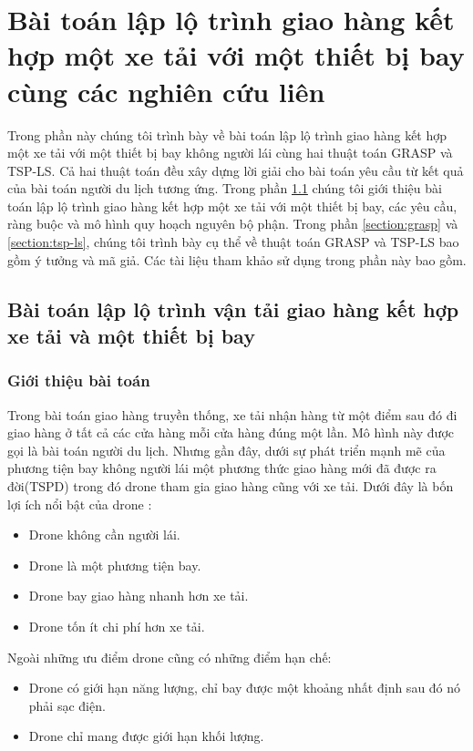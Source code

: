 \documentclass[a4paper,12pt]{report}
\begin{document}
\chapter{Bài toán lập lộ trình giao hàng  kết hợp một xe tải với  một thiết bị bay cùng các nghiên cứu liên }
Trong phần này chúng tôi trình bày về bài toán lập lộ trình giao hàng kết hợp một xe tải với một thiết bị bay không người lái cùng hai thuật toán \ac{GRASP} và TSP-LS. Cả hai thuật toán đều xây dựng lời giải cho bài toán yêu cầu từ kết quả của bài toán người du lịch tương ứng. Trong phần  \ref{section:tspd} chúng tôi giới thiệu bài toán lập lộ trình giao hàng kết hợp một xe tải với một thiết bị bay, các yêu cầu, ràng buộc và mô hình quy hoạch nguyên bộ phận. Trong phần \ref{section:grasp} và \ref{section:tsp-ls}, chúng tôi trình bày cụ thể về thuật toán \ac{GRASP} và TSP-LS bao gồm ý tưởng và mã giả. Các tài liệu tham khảo sử dụng trong phần này bao gồm.
\section{Bài toán lập lộ trình vận tải giao hàng kết hợp xe tải và một thiết bị bay}
\label{section:tspd}
\subsection{Giới thiệu bài toán}
Trong bài toán giao hàng truyền thống, xe tải nhận hàng từ một điểm sau đó đi giao hàng ở tất cả các cửa hàng mỗi cửa hàng đúng một lần. Mô hình này được gọi là bài toán người du lịch. Nhưng gần đây, dưới sự phát triển mạnh mẽ của phương tiện bay không người lái một phương thức giao hàng mới đã được ra đời(\ac{TSPD}) trong đó drone tham gia giao hàng cũng với xe tải. Dưới đây là bốn lợi ích nổi bật của drone \cite{main} :
\begin{itemize}
\item Drone không cần người lái.
\item Drone là một phương tiện bay.
\item Drone bay giao hàng nhanh hơn xe tải.
\item Drone tốn ít chi phí hơn xe tải.
\end{itemize}

Ngoài những ưu điểm drone cũng có những điểm hạn chế:

\begin{itemize}
\item Drone có giới hạn năng lượng, chỉ bay được một khoảng nhất định sau đó nó phải sạc điện.
\item Drone chỉ mang được giới hạn khối lượng.
\end{itemize}
\end{document}
